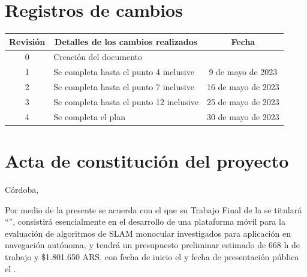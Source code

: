 \documentclass[
11pt, %
codirector, %
]{charter}
\begin{document}
\maketitle
\thispagestyle{empty}
\pagebreak


\thispagestyle{empty}
{\setlength{\parskip}{0pt}
\setcounter{tocdepth}{1}
\tableofcontents{}
}
\pagebreak


\section*{Registros de cambios}
\label{sec:registro}


\begin{table}[ht]
\label{tab:registro}
\centering
\begin{tabularx}{\linewidth}{@{}|c|X|c|@{}}
\hline
\rowcolor[HTML]{C0C0C0} 
Revisión & \multicolumn{1}{c|}{\cellcolor[HTML]{C0C0C0}Detalles de los cambios realizados} & Fecha      \\ \hline
0      & Creación del documento                                 &\fechaInicioName 	 \\ \hline
1      & Se completa hasta el punto 4 inclusive                 & 9 de mayo de 2023  \\ \hline
2      & Se completa hasta el punto 7 inclusive					& 16 de mayo de 2023 \\ \hline
3      & Se completa hasta el punto 12 inclusive                & 25 de mayo de 2023 \\ \hline
4      & Se completa el plan	                                & 30 de mayo de 2023 \\ \hline
\end{tabularx}
\end{table}

\pagebreak



\section*{Acta de constitución del proyecto}
\label{sec:acta}

\begin{flushright}
Córdoba, \fechaInicioName
\end{flushright}

\vspace{2cm}

Por medio de la presente se acuerda con el \authorname\hspace{1px} que su Trabajo Final de la \degreename\hspace{1px} se titulará ``\ttitle'', consistirá esencialmente en el desarrollo de una plataforma móvil para la evaluación de algoritmos de SLAM monocular investigados para aplicación en navegación autónoma, y tendrá un presupuesto preliminar estimado de 668 h de trabajo y \$1.801.650 ARS, con fecha de inicio el \fechaInicioName\hspace{1px} y fecha de presentación pública el \fechaFinalName.
\end{document}
